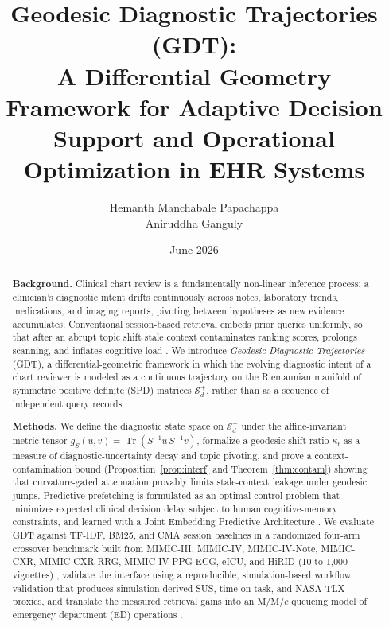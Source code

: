 \documentclass[11pt]{article}
\title{Geodesic Diagnostic Trajectories (GDT):\\
A Differential Geometry Framework for Adaptive Decision Support and Operational Optimization in EHR Systems}
\author{
Hemanth Manchabale Papachappa \\
Aniruddha Ganguly
}
\date{June 2026}
\DeclareMathOperator{\Tr}{Tr}
\begin{document}
\maketitle

\begin{abstract}
\textbf{Background.} Clinical chart review is a fundamentally non-linear inference process: a clinician's diagnostic intent drifts continuously across notes, laboratory trends, medications, and imaging reports, pivoting between hypotheses as new evidence accumulates. Conventional session-based retrieval embeds prior queries uniformly, so that after an abrupt topic shift stale context contaminates ranking scores, prolongs scanning, and inflates cognitive load \citep{croskerry2003}. We introduce \emph{Geodesic Diagnostic Trajectories} (GDT), a differential-geometric framework in which the evolving diagnostic intent of a chart reviewer is modeled as a continuous trajectory on the Riemannian manifold of symmetric positive definite (SPD) matrices $\mathcal{S}_d^+$, rather than as a sequence of independent query records \citep{bronstein2017,lopez2021}.

\textbf{Methods.} We define the diagnostic state space on $\mathcal{S}_d^+$ under the affine-invariant metric tensor $g_S(u,v)=\Tr(S^{-1}u\,S^{-1}v)$, formalize a geodesic shift ratio $\kappa_t$ as a measure of diagnostic-uncertainty decay and topic pivoting, and prove a context-contamination bound (Proposition~\ref{prop:interf} and Theorem~\ref{thm:contam}) showing that curvature-gated attenuation provably limits stale-context leakage under geodesic jumps. Predictive prefetching is formulated as an optimal control problem that minimizes expected clinical decision delay subject to human cognitive-memory constraints, and learned with a Joint Embedding Predictive Architecture \citep{lecun2022,assran2023_ijepa}. We evaluate GDT against TF-IDF, BM25, and CMA session baselines in a randomized four-arm crossover benchmark built from MIMIC-III, MIMIC-IV, MIMIC-IV-Note, MIMIC-CXR, MIMIC-CXR-RRG, MIMIC-IV PPG-ECG, eICU, and HiRID (10 to 1{,}000 vignettes) \citep{johnson2016_mimic3,pollard2018_mimic4,johnson2019_mimic_cxr,johnson2023_mimiciv_note,moody2022_mimic4wdb}, validate the interface using a reproducible, simulation-based workflow validation that produces simulation-derived SUS, time-on-task, and NASA-TLX proxies, and translate the measured retrieval gains into an $\text{M/M}/c$ queueing model of emergency department (ED) operations \citep{kleinrock1975,gross2008}.


\end{abstract}
\end{document}
